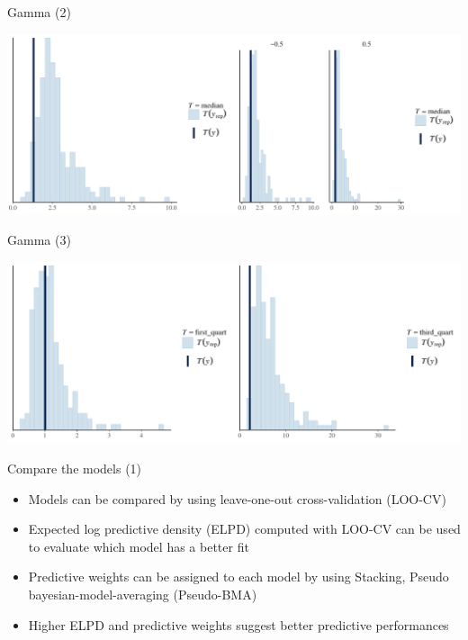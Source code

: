\documentclass[ignorenonframetext,a4paper]{beamer}
\begin{document}
\begin{frame}{Gamma (2)}

\includegraphics{DB_presentation_case_study_files/figure-beamer/unnamed-chunk-19-1.pdf}

\end{frame}

\begin{frame}{Gamma (3)}

\includegraphics{DB_presentation_case_study_files/figure-beamer/unnamed-chunk-20-1.pdf}

\end{frame}

\begin{frame}{Compare the models (1)}

\begin{itemize}
\setlength\itemsep{1em}
  \item{Models can be compared by using leave-one-out cross-validation
        (LOO-CV)}
  \item{Expected log predictive density (ELPD) computed with LOO-CV
        can be used to evaluate which model has a better fit}
  \item{Predictive weights can be assigned to each model by using
        Stacking, Pseudo bayesian-model-averaging (Pseudo-BMA)}
  \item{Higher ELPD and predictive weights suggest better 
        predictive performances}
\end{itemize}

\end{frame}
\end{document}
